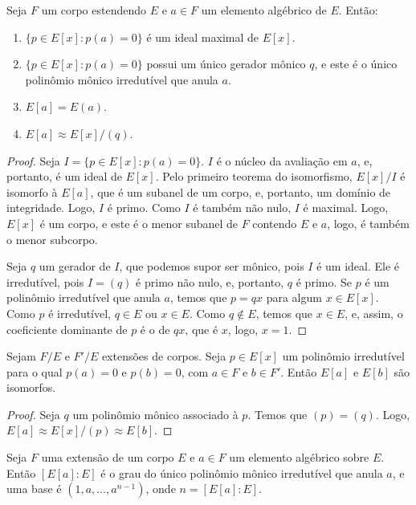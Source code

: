 \begin{prop}
    Seja $F$ um corpo estendendo $E$ e $a\in F$ um elemento algébrico de $E$. Então:
    \begin{enumerate}
        \item $\{p \in E[x]: p(a)=0\}$ é um ideal maximal de $E[x]$.
        \item $\{p \in E[x]: p(a)=0\}$ possui um único gerador mônico $q$, e este é o único polinômio mônico irredutível que anula $a$.
        \item $E[a]=E(a)$.
        \item $E[a]\approx E[x]/(q)$.
    \end{enumerate}
\end{prop}
\begin{proof}
    Seja $I=\{p \in E[x]: p(a)=0\}$. $I$ é o núcleo da avaliação em $a$, e, portanto, é um ideal de $E[x]$.
    Pelo primeiro teorema do isomorfismo, $E[x]/I$ é isomorfo à $E[a]$, que é um subanel de um corpo, e, portanto, um domínio de integridade. Logo, $I$ é primo.
    Como $I$ é também não nulo, $I$ é maximal.
    Logo, $E[x]$ é um corpo, e este é o menor subanel de $F$ contendo $E$ e $a$, logo, é também o menor subcorpo.

    Seja $q$ um gerador de $I$, que podemos supor ser mônico, pois $I$ é um ideal.
    Ele é irredutível, pois $I=(q)$ é primo não nulo, e, portanto, $q$ é primo.
    Se $p$ é um polinômio irredutível que anula $a$, temos que $p=qx$ para algum $x \in E[x]$. Como $p$ é irredutível, $q \in E$ ou $x \in E$. Como $q \notin E$, temos que $x \in E$, e, assim, o coeficiente dominante de $p$ é o de $qx$, que é $x$, logo, $x=1$.
\end{proof}
\begin{corol}
    Sejam $F/E$ e $F'/E$ extensões de corpos. Seja $p\in E[x]$ um polinômio irredutível para o qual $p(a)=0$ e $p(b)=0$, com $a \in F$ e $b \in F'$.
    Então $E[a]$ e $E[b]$ são isomorfos.
\end{corol}
\begin{proof}
    Seja $q$ um polinômio mônico associado à $p$. Temos que $(p)=(q)$. Logo, $E[a]\approx E[x]/(p)\approx E[b]$.
\end{proof}
\begin{prop}
    Seja $F$ uma extensão de um corpo $E$ e $a \in F$ um elemento algébrico sobre $E$. Então $[E[a]:E]$ é o grau do único polinômio mônico irredutível que anula $a$, e uma base é $(1, a, \dots, a^{n-1})$, onde $n=[E[a]:E]$.
\end{prop}
